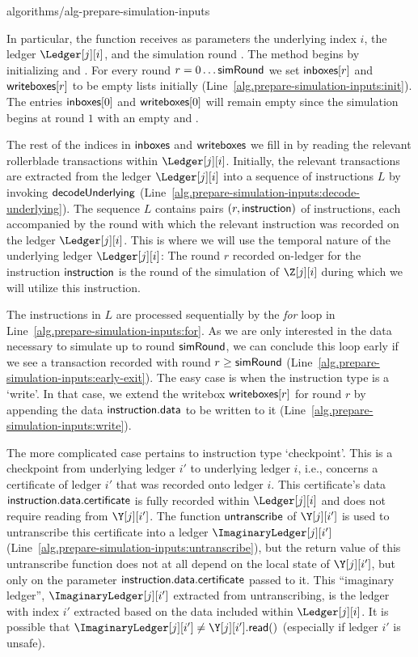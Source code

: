 {algorithms/alg-prepare-simulation-inputs}

In particular, the function \prepareSimulationInputs receives as parameters
the underlying index $i$, the ledger $\Ledger[j][i]$,
and the simulation round \simulationRound.
The method begins by initializing \inboxes and \writeboxes. For every round $r = 0 \ldots \textsf{simRound}$ we set
$\textsf{inboxes}[r]$ and $\textsf{writeboxes}[r]$ to be empty lists initially (Line~\ref{alg.prepare-simulation-inputs:init}).
The entries $\textsf{inboxes}[0]$ and $\textsf{writeboxes}[0]$ will remain empty
since the simulation begins at round $1$ with an empty \inbox and \writebox.

The rest of the indices in $\textsf{inboxes}$
and $\textsf{writeboxes}$ we fill in by reading the relevant rollerblade transactions within $\Ledger[j][i]$.
Initially, the relevant transactions are extracted from the ledger $\Ledger[j][i]$ into a sequence
of instructions $L$ by invoking $\textsf{decodeUnderlying}$ (Line~\ref{alg.prepare-simulation-inputs:decode-underlying}).
The sequence $L$ contains pairs $(r, \textsf{instruction})$ of instructions, each accompanied by the round with which
the relevant instruction was recorded on the ledger $\Ledger[j][i]$. This is where we will use the temporal
nature of the underlying ledger $\Ledger[j][i]$: The round $r$ recorded on-ledger for the instruction
$\textsf{instruction}$ is the round of the simulation of $\Z[j][i]$ during which we will utilize this instruction.

The instructions in $L$ are processed sequentially by the \emph{for} loop in Line~\ref{alg.prepare-simulation-inputs:for}.
As we are only interested in the data necessary to simulate up to round $\textsf{simRound}$, we can conclude this loop
early if we see a transaction recorded with round $r \geq \textsf{simRound}$ (Line~\ref{alg.prepare-simulation-inputs:early-exit}).
The easy case is when the instruction type is a `write'. In that case, we extend the writebox $\textsf{writeboxes}[r]$
for round $r$ by appending the data $\textsf{instruction}.\textsf{data}$ to be written to it (Line~\ref{alg.prepare-simulation-inputs:write}).

The more complicated case pertains to instruction type `checkpoint'. This is a checkpoint from underlying
ledger $i'$ to underlying ledger $i$, i.e., concerns a certificate of ledger $i'$ that was recorded onto
ledger $i$. This certificate's data $\textsf{instruction}.\textsf{data}.\textsf{certificate}$ is fully recorded within $\Ledger[j][i]$
and does not require reading from $\Y[j][i']$. The function $\textsf{untranscribe}$ of $\Y[j][i']$ is used to untranscribe
this certificate into a ledger $\ImaginaryLedger[j][i']$ (Line~\ref{alg.prepare-simulation-inputs:untranscribe}),
but the return value of this untranscribe function does not at all depend on the local state of $\Y[j][i']$,
but only on the parameter $\textsf{instruction}.\textsf{data}.\textsf{certificate}$ passed to it. This ``imaginary ledger'',
$\ImaginaryLedger[j][i']$ extracted from untranscribing, is the ledger with index $i'$ extracted
based on the data included within $\Ledger[j][i]$. It is possible that
$\ImaginaryLedger[j][i'] \neq \Y[j][i'].\lread()$ (especially if ledger $i'$ is unsafe).


